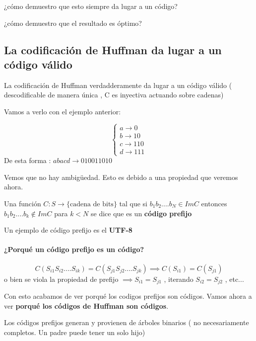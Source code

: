 ¿cómo demuestro que esto siempre da lugar a un código?

¿cómo demuestro que el resultado es óptimo?

\subsection{La codificación de Huffman da lugar a un código válido}

La codificación de Huffman verdadderamente da lugar a un código válido ( descodificable de manera única , C es inyectiva actuando sobre cadenas)

Vamos a verlo con el ejemplo anterior:
\begin{example}
	 $$\begin{cases}
	 a \rightarrow 0 \\ b \rightarrow 10 \\ c \rightarrow 110\\ d \rightarrow 111
	 \end{cases}$$
	 De esta forma : $ abacd \rightarrow 010011010$
	 
	 Vemos que no hay ambigüedad. Esto es debido a una propiedad que veremos ahora.
\end{example}

\begin{defn}
	
	
	Una función $C : S \rightarrow \{ \text{cadena de bits}\}$ tal que si $b_1 b_2 .... b_N \in Im C$ entonces $b_1 b_2 .... b_k \notin Im C$ para $k < N$ se dice que es un \textbf{código prefijo}
	
	Un ejemplo de código prefijo es el \textbf{UTF-8}
\end{defn}


\paragraph{¿Porqué un código prefijo es un código?}

$$C (S_{i1} S_{i2} .... S_{ik}) = C(S_{j1} S_{j2} .... S_{jk}) \implies C(S_{i1}) = C(S_{j1})$$
o bien se viola la propiedad de prefijo $\implies S_{i1} = S_{j1}$ , iterando $S_{i2} = S_{j2}$ , etc...

Con esto acabamos de ver porqué los codigos prefijos son códigos. Vamos ahora a ver \textbf{porqué los códigos de Huffman son códigos}.

Los códigos prefijos generan y provienen de árboles binarios ( no necesariamente completos. Un padre puede tener un solo hijo)

